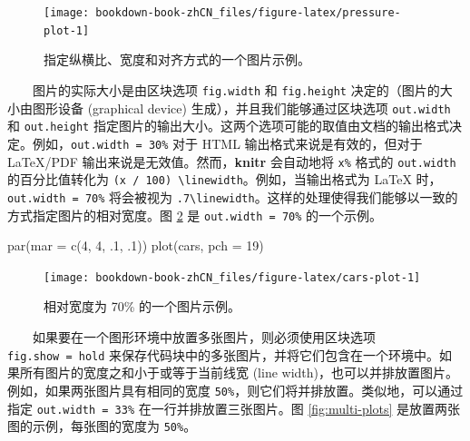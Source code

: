 \documentclass[
  12pt,
]{krantz}
\newenvironment{Shaded}{\begin{snugshade}}{\end{snugshade}}
\newcommand{\AttributeTok}[1]{\textcolor[rgb]{0.77,0.63,0.00}{#1}}
\newcommand{\DecValTok}[1]{\textcolor[rgb]{0.00,0.00,0.81}{#1}}
\newcommand{\FunctionTok}[1]{\textcolor[rgb]{0.00,0.00,0.00}{#1}}
\newcommand{\NormalTok}[1]{#1}
\theoremstyle{definition}
\theoremstyle{definition}
\theoremstyle{definition}
\theoremstyle{definition}
\theoremstyle{remark}
\begin{document}
\begin{figure}

{\centering \texttt{[image: bookdown-book-zhCN\_files/figure-latex/pressure-plot-1]} 

}

\caption{指定纵横比、宽度和对齐方式的一个图片示例。}\label{fig:pressure-plot}
\end{figure}

  图片的实际大小是由区块选项 \texttt{fig.width} 和 \texttt{fig.height} 决定的（图片的大小由图形设备 (graphical device) 生成），并且我们能够通过区块选项 \texttt{out.width} 和 \texttt{out.height} 指定图片的输出大小。这两个选项可能的取值由文档的输出格式决定。例如，\texttt{out.width\ =\ \textquotesingle{}30\%\textquotesingle{}} 对于 HTML 输出格式来说是有效的，但对于 LaTeX/PDF 输出来说是无效值。然而，\textbf{knitr} 会自动地将 \texttt{x\%} 格式的 \texttt{out.width} 的百分比值转化为 \texttt{(x\ /\ 100)\ \textbackslash{}linewidth}。例如，当输出格式为 LaTeX 时，\texttt{out.width\ =\ \textquotesingle{}70\%\textquotesingle{}} 将会被视为 \texttt{.7\textbackslash{}linewidth}。这样的处理使得我们能够以一致的方式指定图片的相对宽度。图 \ref{fig:cars-plot} 是 \texttt{out.width\ =\ 70\%} 的一个示例。

\begin{Shaded}
\begin{Highlighting}[]
\FunctionTok{par}\NormalTok{(}\AttributeTok{mar =} \FunctionTok{c}\NormalTok{(}\DecValTok{4}\NormalTok{, }\DecValTok{4}\NormalTok{, .}\DecValTok{1}\NormalTok{, .}\DecValTok{1}\NormalTok{))}
\FunctionTok{plot}\NormalTok{(cars, }\AttributeTok{pch =} \DecValTok{19}\NormalTok{)}
\end{Highlighting}
\end{Shaded}

\begin{figure}
\texttt{[image: bookdown-book-zhCN\_files/figure-latex/cars-plot-1]} \caption{相对宽度为 70\% 的一个图片示例。}\label{fig:cars-plot}
\end{figure}

  如果要在一个图形环境中放置多张图片，则必须使用区块选项 \texttt{fig.show\ =\ \textquotesingle{}hold\textquotesingle{}} 来保存代码块中的多张图片，并将它们包含在一个环境中。如果所有图片的宽度之和小于或等于当前线宽 (line width)，也可以并排放置图片。例如，如果两张图片具有相同的宽度 \texttt{50\%}，则它们将并排放置。类似地，可以通过指定 \texttt{out.width\ =\ \textquotesingle{}33\%\textquotesingle{}} 在一行并排放置三张图片。图 \ref{fig:multi-plots} 是放置两张图的示例，每张图的宽度为 \texttt{50\%}。
\end{document}
